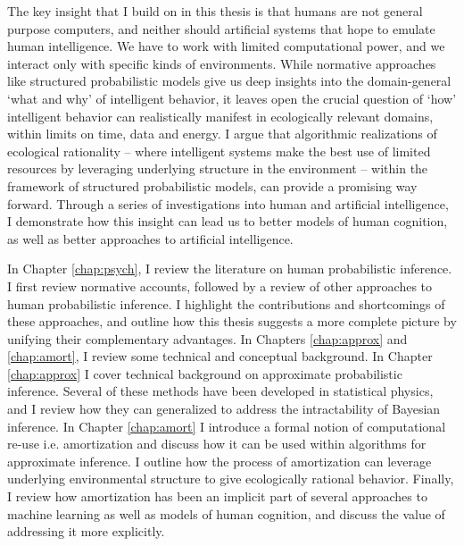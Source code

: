 The key insight that I build on in this thesis is that humans are not general purpose computers, and neither should artificial systems that hope to emulate human intelligence. We have to work with limited computational power, and we interact only with specific kinds of environments. While normative approaches like structured probabilistic models give us deep insights into the domain-general `what and why' of intelligent behavior, it leaves open the crucial question of `how' intelligent behavior can realistically manifest in ecologically relevant domains, within limits on time, data and energy. I argue that algorithmic realizations of ecological rationality -- where intelligent systems make the best use of limited resources by leveraging underlying structure in the environment -- within the framework of structured probabilistic models, can provide a promising way forward. Through a series of investigations into human and artificial intelligence, I demonstrate how this insight can lead us to better models of human cognition, as well as better approaches to artificial intelligence.

In Chapter \ref{chap:psych}, I review the literature on human probabilistic inference. I first review normative accounts, followed by a review of other approaches to human probabilistic inference. I highlight the contributions and shortcomings of these approaches, and outline how this thesis suggests a more complete picture by unifying their complementary advantages. In Chapters \ref{chap:approx} and \ref{chap:amort}, I review some technical and conceptual background. In Chapter \ref{chap:approx} I cover technical background on approximate probabilistic inference. Several of these methods have been developed in statistical physics, and I review how they can generalized to address the intractability of Bayesian inference. In Chapter \ref{chap:amort} I introduce a formal notion of computational re-use i.e. amortization and discuss how it can be used within algorithms for approximate inference. I outline how the process of amortization can leverage underlying environmental structure to give ecologically rational behavior. Finally, I review how amortization has been an implicit part of several approaches to machine learning as well as models of human cognition, and discuss the value of addressing it more explicitly.


